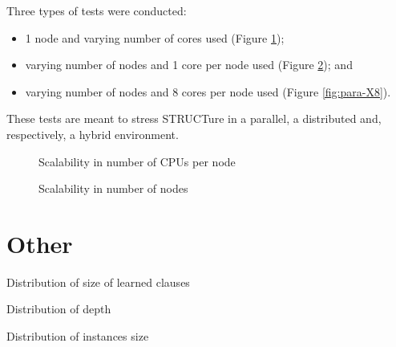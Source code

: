 Three types of tests were conducted:
\begin{itemize}
  \item 1 node and varying number of cores used (Figure \ref{fig:para-1X});
  \item varying number of nodes and 1 core per node used (Figure \ref{fig:para-X1}); and
  \item varying number of nodes and 8 cores per node used (Figure \ref{fig:para-X8}).
\end{itemize}
These tests are meant to stress STRUCTure in a parallel, a distributed
and, respectively, a hybrid environment.

\begin{figure}
  \centering
  \caption{Scalability in number of CPUs per node}
  \label{fig:para-1X}
\end{figure}

\begin{figure}
  \centering
  \caption{Scalability in number of nodes}
  \label{fig:para-X1}
\end{figure}
  



\section{Other}

Distribution of size of learned clauses 

Distribution of depth

Distribution of instances size
